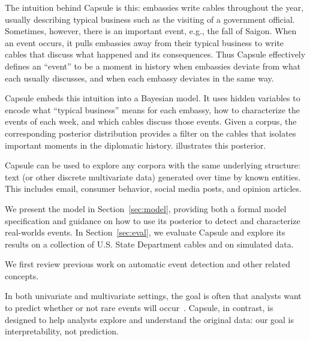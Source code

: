 The intuition behind Capsule is this: embassies write cables
throughout the year, usually describing typical business such as the
visiting of a government official. Sometimes, however, there is an
important event, e.g., the fall of Saigon. When an event occurs, it
pulls embassies away from their typical business to write cables that
discuss what happened and its consequences. Thus Capsule effectively
defines an ``event'' to be a moment in history when embassies deviate
from what each usually discusses, and when each embassy deviates in
the same way.

Capsule embeds this intuition into a Bayesian model. It uses hidden
variables to encode what ``typical business'' means for each embassy,
how to characterize the events of each week, and which cables discuss
those events. Given a corpus, the corresponding posterior distribution
provides a filter on the cables that isolates important moments in the
diplomatic history.  illustrates this
posterior.

Capsule can be used to explore any corpora with the same underlying
structure: text (or other discrete multivariate data) generated over time by known entities.  This includes
email, consumer behavior, social media posts, and opinion articles.

We present the model in Section~\ref{sec:model}, providing both a formal
model specification and guidance on how to use its posterior to detect 
and characterize real-worlds events.
In Section~\ref{sec:eval}, we evaluate Capsule and explore its results on
a collection of U.S. State Department cables and on simulated data.

 We first review previous work on automatic
event detection and other related concepts.

In both univariate and multivariate settings, the goal is often that analysts want to predict whether or not rare events will occur~\cite{weiss1998learning,das2008anomaly}.  Capsule, in contrast, is designed to help analysts explore and understand the original data: our goal is interpretability, not prediction.

